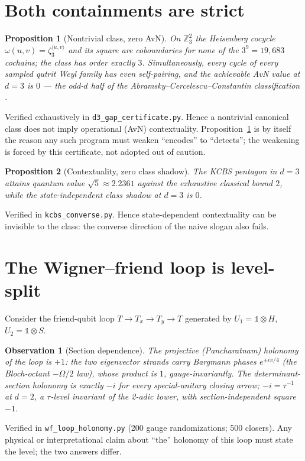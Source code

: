 \documentclass[11pt]{article}
\newtheorem{proposition}{Proposition}
\newtheorem{observation}{Observation}
\theoremstyle{remark}
\theoremstyle{plain}
\begin{document}
\section{Both containments are strict}
\begin{proposition}[Nontrivial class, zero AvN]\label{prop:gap1}
On $\mathbb{Z}_3^2$ the Heisenberg cocycle $\omega(u,v)=\zeta_3^{\langle u,v\rangle}$ and
its square are coboundaries for none of the $3^9=19{,}683$ cochains; the class has order
exactly $3$. Simultaneously, every cycle of every sampled qutrit Weyl family has even
self-pairing, and the achievable AvN value at $d=3$ is $0$ --- the odd-$d$ half of the
Abramsky--Cercelescu--Constantin classification \cite{ACC}.
\end{proposition}
Verified exhaustively in \texttt{d3\_gap\_certificate.py}. Hence a nontrivial canonical
class does not imply operational (AvN) contextuality. Proposition~\ref{prop:gap1} is by
itself the reason any such program must weaken ``encodes'' to ``detects''; the weakening is
forced by this certificate, not adopted out of caution.

\begin{proposition}[Contextuality, zero class shadow]\label{prop:gap2}
The KCBS pentagon in $d=3$ attains quantum value $\sqrt{5}\approx 2.2361$ against the
exhaustive classical bound $2$, while the state-independent class shadow at $d=3$ is $0$.
\end{proposition}
Verified in \texttt{kcbs\_converse.py}. Hence state-dependent contextuality can be
invisible to the class: the converse direction of the naive slogan also fails.

\section{The Wigner--friend loop is level-split}\label{sec:wf}
Consider the friend-qubit loop $T \to T_x \to T_y \to T$ generated by
$U_1=\mathbb{1}\otimes H$, $U_2=\mathbb{1}\otimes S$.

\begin{observation}[Section dependence]\label{obs:wf}
The projective (Pancharatnam) holonomy of the loop is $+1$: the two eigenvector strands
carry Bargmann phases $e^{\pm i\pi/4}$ (the Bloch-octant $-\Omega/2$ law), whose product
is $1$, gauge-invariantly. The determinant-section holonomy is exactly $-i$ for every
special-unitary closing arrow; $-i=\tau^{-1}$ at $d=2$, a $\tau$-level invariant of the
2-adic tower, with section-independent square $-1$.
\end{observation}
Verified in \texttt{wf\_loop\_holonomy.py} (200 gauge randomizations; 500 closers). Any
physical or interpretational claim about ``the'' holonomy of this loop must state the
level; the two answers differ.
\end{document}
